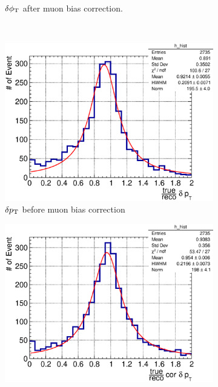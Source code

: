 \begin{figure}
\begin{subfigure}[b]{\dbfigwid\textwidth}
               \caption{$\delta\phi_\textrm{T}$ after muon bias correction.}
               \label{subfig:esc-dphit-afmu}
          \end{subfigure}
          \\
          \begin{subfigure}[b]{\dbfigwid\textwidth}
               \centering
               \includegraphics[width=\textwidth]{figures/perf/tki/dpt_rat_hist_al14.eps}
               \caption{$\delta p_\textrm{T}$ before muon bias correction}
               \label{subfig:esc-dpt-bfmu}
          \end{subfigure}
          \begin{subfigure}[b]{\dbfigwid\textwidth}
               \centering
               \includegraphics[width=\textwidth]{figures/perf/tki/cor_dpt_rat_hist_al14.eps}

\end{subfigure}
\end{figure}
